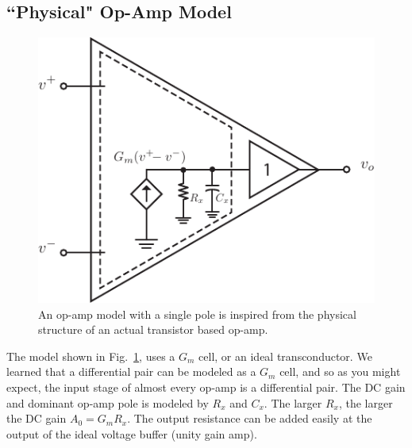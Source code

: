 \subsection{``Physical" Op-Amp Model}
\begin{figure}[tb]
\centering
\includegraphics[scale=1]{opamp_model_pole}
\caption{An op-amp model with a single pole is inspired from the physical structure of an actual transistor based op-amp.}
\label{fig:opamp_model_pole}
\end{figure}
The model shown in Fig.~\ref{fig:opamp_model_pole}, uses a $G_m$ cell, or an ideal transconductor.  We learned that a differential pair can be modeled as a $G_m$ cell, and so as you might expect, the input stage of almost every op-amp is a differential pair.  The DC gain and dominant op-amp pole is modeled by $R_x$ and $C_x$.  The larger $R_x$, the larger the DC gain $A_0 = G_m R_x$.  The output resistance can be added easily at the output of the ideal voltage buffer (unity gain amp).
